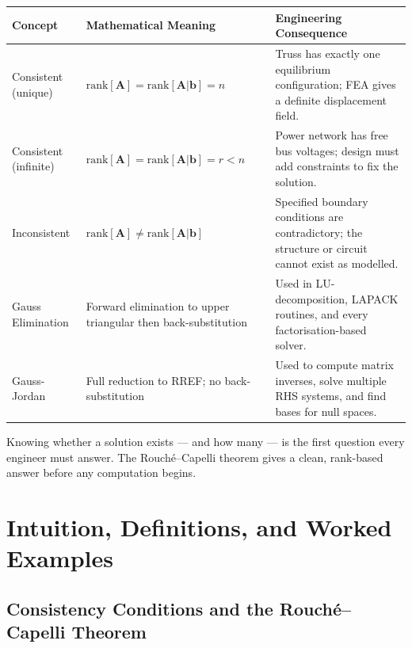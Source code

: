 \documentclass[12pt,a4paper]{article}
\begin{document}
\begin{center}
\begin{tabular}{@{}p{3.5cm}p{4.5cm}p{5.5cm}@{}}
\toprule
\textbf{Concept} & \textbf{Mathematical Meaning} & \textbf{Engineering Consequence} \\
\midrule
Consistent (unique) & $\text{rank}[\mathbf{A}] = \text{rank}[\mathbf{A}|\mathbf{b}] = n$ &
  Truss has exactly one equilibrium configuration; FEA gives a definite displacement field. \\
\addlinespace
Consistent (infinite) & $\text{rank}[\mathbf{A}] = \text{rank}[\mathbf{A}|\mathbf{b}] = r < n$ &
  Power network has free bus voltages; design must add constraints to fix the solution. \\
\addlinespace
Inconsistent & $\text{rank}[\mathbf{A}] \neq \text{rank}[\mathbf{A}|\mathbf{b}]$ &
  Specified boundary conditions are contradictory; the structure or circuit cannot exist as modelled. \\
\addlinespace
Gauss Elimination & Forward elimination to upper triangular then back-substitution &
  Used in LU-decomposition, LAPACK routines, and every factorisation-based solver. \\
\addlinespace
Gauss-Jordan & Full reduction to RREF; no back-substitution & Used to compute matrix inverses, solve multiple RHS systems, and find bases for null spaces. \\
\bottomrule
\end{tabular}
\end{center}

\begin{learnbox}
Knowing whether a solution exists --- and how many --- is the first question every engineer must answer.
The Rouch\'{e}--Capelli theorem gives a clean, rank-based answer before any computation begins.
\end{learnbox}

\section{Intuition, Definitions, and Worked Examples}

\subsection{Consistency Conditions and the Rouch\'{e}--Capelli Theorem}
\end{document}
